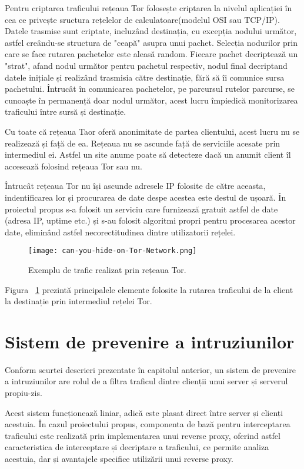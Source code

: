   
Pentru criptarea traficului rețeaua Tor folosește criptarea la nivelul aplicației în cea ce privește sructura rețelelor de calculatoare(modelul OSI sau TCP/IP). Datele trasmise sunt criptate, incluzând destinația, cu excepția nodului următor, astfel creându-se structura de "ceapă" asupra unui pachet. Selecția nodurilor prin care se face rutarea pachetelor este aleasă random. Fiecare pachet decriptează un "strat", afand nodul următor pentru pachetul respectiv, nodul final decriptand datele inițiale și realizând trasmisia către destinație, fără să îi comunice sursa pachetului. Întrucât în comunicarea pachetelor, pe parcursul rutelor parcurse, se cunoaște în permanență doar nodul următor, acest lucru împiedică monitorizarea traficului între sursă și destinație. 


Cu toate că rețeaua Taor oferă anonimitate de partea clientului, acest lucru nu se realizează și față de ea. Rețeaua nu se ascunde față de serviciile acesate prin intermediul ei. Astfel un site anume poate să detecteze dacă un anumit client îl accesează folosind rețeaua Tor sau nu. 

Întrucât rețeaua Tor nu își ascunde adresele IP folosite de către aceasta, indentificarea lor și procurarea de date despe acestea este destul de ușoară. În proiectul propus s-a folosit un serviciu care furnizează gratuit astfel de date \cite{tot_status}(adresa IP, uptime etc.) și s-au folosit algoritmi propri pentru procesarea acestor date, eliminând astfel necorectitudinea dintre utilizatorii rețelei. 

\begin{figure}[h]
	\centering
	\texttt{[image: can-you-hide-on-Tor-Network.png]}
	\caption{ Exemplu de trafic realizat prin rețeaua Tor. }
	\label{fig:tor-example}
\end{figure}

Figura ~\ref{fig:tor-example}  prezintă principalele elemente folosite la rutarea traficului de la client la destinație prin intermediul rețelei Tor. \\


\section{Sistem de prevenire a intruziunilor}
Conform scurtei descrieri prezentate în capitolul anterior, un sistem de prevenire a intruziunilor are rolul de a filtra traficul dintre clienții unui server și serverul propiu-zis. 

Acest sistem funcționează liniar, adică este plasat direct între server și clienți acestuia. În cazul proiectului propus, componenta de bază pentru interceptarea traficului este realizată prin implementarea unui reverse proxy, oferind astfel caracteristica de interceptare și decriptare a traficului, ce permite analiza acestuia, dar și avantajele specifice utilizării unui reverse proxy. 

